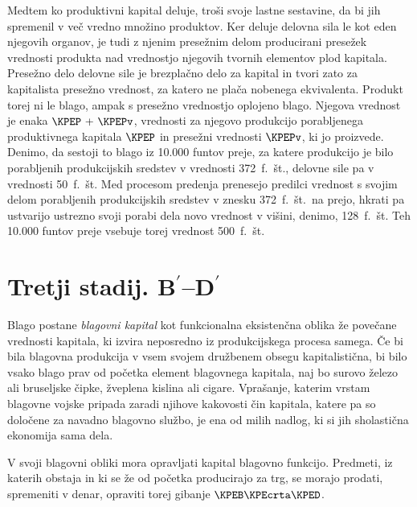 \documentclass[kapital_02.tex]{subfiles}
\begin{document}
Medtem ko produktivni kapital deluje, troši svoje lastne sestavine, da bi jih spremenil v več vredno množino produktov. Ker deluje delovna sila le kot eden njegovih organov, je tudi z njenim presežnim delom producirani presežek vrednosti produkta nad vrednostjo njegovih tvornih elementov plod kapitala. Presežno delo delovne sile je brezplačno delo za kapital in tvori zato za kapitalista presežno vrednost, za katero ne plača nobenega ekvivalenta. Produkt torej ni le blago, ampak s presežno vrednostjo oplojeno blago. Njegova vrednost je enaka \(\KPEP \textrm{ + } \KPEPv\), vrednosti za njegovo produkcijo porabljenega produktivnega kapitala \(\KPEP\) in presežni vrednosti \(\KPEPv\), ki jo proizvede. Denimo, da sestoji to blago iz 10.000 funtov preje, za katere produkcijo je bilo porabljenih produkcijskih sredstev v vrednosti 372\ f.\ št., delovne sile pa v vrednosti 50\ f.\ št. Med procesom predenja prenesejo predilci vrednost s svojim delom porabljenih produkcijskih sredstev v znesku 372\ f.\ št.\ na prejo, hkrati pa ustvarijo ustrezno svoji porabi dela novo vrednost v višini, denimo, 128\ f.\ št. Teh 10.000 funtov preje vsebuje torej vrednost 500\ f.\ št.

\section{Tretji stadij. B\ensuremath{^\prime}--D\ensuremath{^\prime}}

Blago \KPEstran postane \emph{blagovni kapital} kot funkcionalna eksistenčna oblika že povečane vrednosti kapitala, ki izvira neposredno iz produkcijskega procesa samega. Če bi bila blagovna produkcija v vsem svojem družbenem obsegu kapitalistična, bi bilo vsako blago prav od početka element blagovnega kapitala, naj bo surovo železo ali bruseljske čipke, žveplena kislina ali cigare. Vprašanje, katerim vrstam blagovne vojske pripada zaradi njihove kakovosti čin kapitala, katere pa so določene za navadno blagovno službo, je ena od milih nadlog, ki si jih sholastična ekonomija sama dela.

V svoji blagovni obliki mora opravljati kapital blagovno funkcijo. Predmeti, iz katerih obstaja in ki se že od početka producirajo za trg, se morajo prodati, spremeniti v denar, opraviti torej gibanje \(\KPEB\KPEcrta\KPED\).
\end{document}
